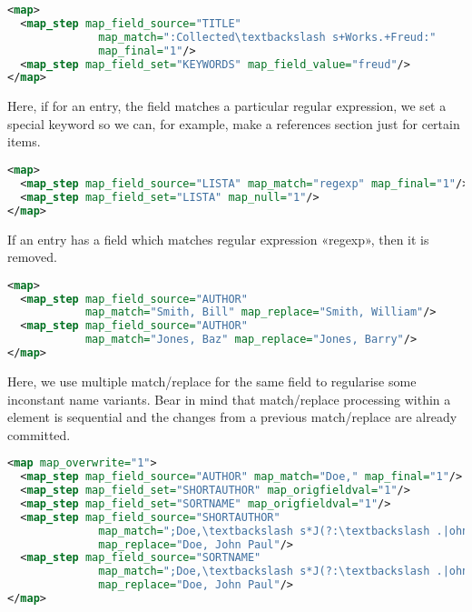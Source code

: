\documentclass{ltxdockit}
\begin{document}
\begin{lstlisting}[language=xml,escapechar=:,mathescape=true]
<map>
  <map_step map_field_source="TITLE"
              map_match=":Collected\textbackslash s+Works.+Freud:"
              map_final="1"/>
  <map_step map_field_set="KEYWORDS" map_field_value="freud"/>
</map>
\end{lstlisting}

\noindent Here, if for an entry, the  field matches a
particular regular expression, we set a special keyword so we can, for
example, make a references section just for certain items.

\begin{lstlisting}[language=xml,escapechar=:,mathescape=true]
<map>
  <map_step map_field_source="LISTA" map_match="regexp" map_final="1"/>
  <map_step map_field_set="LISTA" map_null="1"/>
</map>
\end{lstlisting}

\noindent If an entry has a  field which matches regular
expression «regexp», then it is removed.

\begin{lstlisting}[language=xml,escapechar=:,mathescape=true]
<map>
  <map_step map_field_source="AUTHOR"
            map_match="Smith, Bill" map_replace="Smith, William"/>
  <map_step map_field_source="AUTHOR"
            map_match="Jones, Baz" map_replace="Jones, Barry"/>
</map>
\end{lstlisting}

\noindent Here, we use multiple match/replace for the same field to
regularise some inconstant name variants. Bear in mind that
match/replace processing within a  element is sequential and
the changes from a previous match/replace are already committed.

\begin{lstlisting}[language=xml,escapechar=;,mathescape=true]
<map map_overwrite="1">
  <map_step map_field_source="AUTHOR" map_match="Doe," map_final="1"/>
  <map_step map_field_set="SHORTAUTHOR" map_origfieldval="1"/>
  <map_step map_field_set="SORTNAME" map_origfieldval="1"/>
  <map_step map_field_source="SHORTAUTHOR"
              map_match=";Doe,\textbackslash s*J(?:\textbackslash .|ohn)(?:[-]*)(?:P\textbackslash .|Paul)*;"
              map_replace="Doe, John Paul"/>
  <map_step map_field_source="SORTNAME"
              map_match=";Doe,\textbackslash s*J(?:\textbackslash .|ohn)(?:[-]*)(?:P\textbackslash .|Paul)*;"
              map_replace="Doe, John Paul"/>
</map>
\end{lstlisting}
\end{document}
